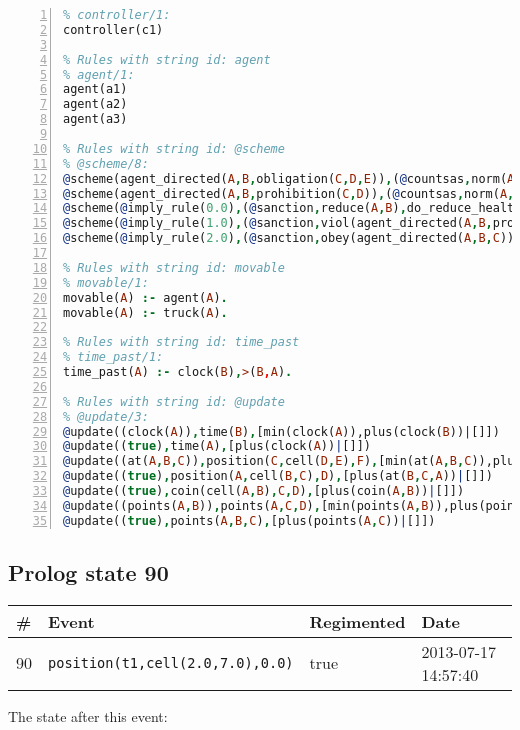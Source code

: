 \documentclass[11pt]{article}\usepackage[utf8]{inputenc}\usepackage{geometry}
\begin{document}
\begin{lstlisting}[language=Prolog, numbers=left]
% Rules with string id: controller
% controller/1:
controller(c1)

% Rules with string id: agent
% agent/1:
agent(a1)
agent(a2)
agent(a3)

% Rules with string id: @scheme
% @scheme/8:
@scheme(agent_directed(A,B,obligation(C,D,E)),(@countsas,norm(A,B,F,obligation(C,D,E)),F),false,(listTrue(C)),(time_past(D)),false,[plus(viol(agent_directed(A,B,obligation(C,D,E))))|[]],[plus(obey(agent_directed(A,B,obligation(C,D,E))))|[]])
@scheme(agent_directed(A,B,prohibition(C,D)),(@countsas,norm(A,B,E,prohibition(C,D)),E),(listTrue(C)),false,(false),false,[plus(viol(agent_directed(A,B,prohibition(C,D))))|[]],[plus(obey(agent_directed(A,B,prohibition(C,D))))|[]])
@scheme(@imply_rule(0.0),(@sanction,reduce(A,B),do_reduce_health(A,B),notifyAgent(A,changed(status))),true,false,false,false,[min(reduce(A,B))|[]],[])
@scheme(@imply_rule(1.0),(@sanction,viol(agent_directed(A,B,prohibition(C,D))),do_sanction(D)),true,false,false,false,[min(viol(agent_directed(A,B,prohibition(C,D))))|[]],[])
@scheme(@imply_rule(2.0),(@sanction,obey(agent_directed(A,B,C))),true,false,false,false,[min(obey(agent_directed(A,B,C)))|[]],[])

% Rules with string id: movable
% movable/1:
movable(A) :- agent(A).
movable(A) :- truck(A).

% Rules with string id: time_past
% time_past/1:
time_past(A) :- clock(B),>(B,A).

% Rules with string id: @update
% @update/3:
@update((clock(A)),time(B),[min(clock(A)),plus(clock(B))|[]])
@update((true),time(A),[plus(clock(A))|[]])
@update((at(A,B,C)),position(C,cell(D,E),F),[min(at(A,B,C)),plus(at(D,E,C))|[]])
@update((true),position(A,cell(B,C),D),[plus(at(B,C,A))|[]])
@update((true),coin(cell(A,B),C,D),[plus(coin(A,B))|[]])
@update((points(A,B)),points(A,C,D),[min(points(A,B)),plus(points(A,D))|[]])
@update((true),points(A,B,C),[plus(points(A,C))|[]])

\end{lstlisting}
\clearpage 
\subsection{Prolog state 90}
\begin{table}[ht]
\centering 
\begin{tabular}{l l l l} 
\textbf{\#} & \textbf{Event} & \textbf{Regimented} & \textbf{Date} \\ [0.5ex] 
\hline
90&\texttt{position(t1,cell(2.0,7.0),0.0)}&true&2013-07-17 14:57:40\\ [1ex] \hline\end{tabular}
\end{table}
The state after this event:
\end{document}
